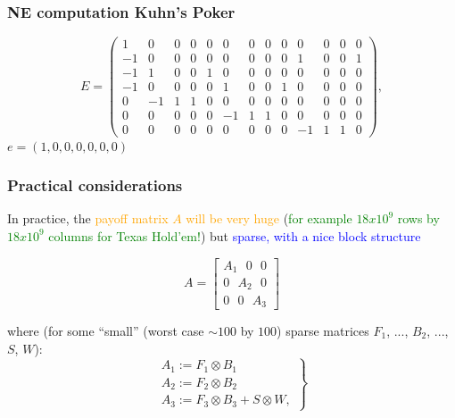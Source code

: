 \documentclass[xcolor=dvipsnames]{beamer}
\begin{document}
\begin{frame}
  \frametitle{NE computation Kuhn's Poker}
  \[   E = \left( \begin{array}{ccccccccccccc}
1&0&0&0&0&0&0&0&0&0&0&0&0\\-1&0&0&0&0&0&0&0&0&1&0&0&1\\-1&1&0&0&1&0&0&0&0&0&0&0&0\\-1&0&0&0&0&1&0&0&1&0&0&0&0\\0&-1&1&1&0&0&0&0&0&0&0&0&0\\0&0&0&0&0&-1&1&1&0&0&0&0&0\\0&0&0&0&0&0&0&0&0&-1&1&1&0
\end{array} \right),\]
  $e = (1, 0, 0, 0, 0, 0, 0)$

\end{frame}

\begin{frame}
  \frametitle{Practical considerations}
  In practice, the \textcolor{orange}{payoff matrix $A$ will be very huge} (\textcolor{green}{for example $18 x 10^9$ rows by $18 x 10^9$ columns for Texas Hold'em!}) but \textcolor{blue}{sparse, with a nice block structure} 

\begin{equation}
  A = \begin{bmatrix}A_1\text{ }0 \text{ }0\\ 0\text{ }A_2\text{ }0 \\0 \text{ } 0\text{ }A_3\end{bmatrix}
\end{equation}

where (for some ``small'' (worst case $\sim 100$ by $100$) sparse matrices $F_1$, ..., $B_2$, ..., $S$, $W$):
\begin{equation}
  \left .
  \begin{split}
    A_1 := F_1 \otimes B_1\\
    A_2 := F_2 \otimes B_2\\
    A_3 := F_3 \otimes B_3 + S \otimes W,
  \end{split}
  \right\}
\end{equation}
\end{frame}

\end{document}
